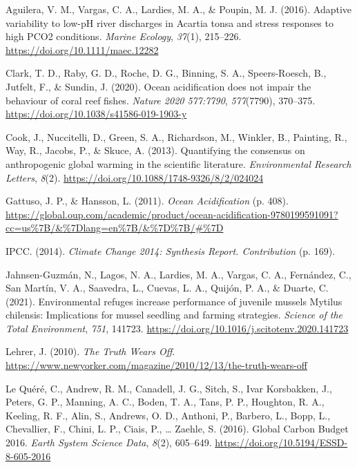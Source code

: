 \documentclass[
]{article}
\newlength{\cslhangindent}
\newenvironment{cslreferences}%
  {\setlength{\parindent}{0pt}%
  \everypar{\setlength{\hangindent}{\cslhangindent}}\ignorespaces}%
  {\par}
\begin{document}
\hypertarget{refs}{}
\begin{cslreferences}
\leavevmode\hypertarget{ref-Aguilera2016}{}%
Aguilera, V. M., Vargas, C. A., Lardies, M. A., \& Poupin, M. J. (2016).
Adaptive variability to low-pH river discharges in Acartia tonsa and
stress responses to high PCO2 conditions. \emph{Marine Ecology},
\emph{37}(1), 215--226. \url{https://doi.org/10.1111/maec.12282}

\leavevmode\hypertarget{ref-Clark2020}{}%
Clark, T. D., Raby, G. D., Roche, D. G., Binning, S. A., Speers-Roesch,
B., Jutfelt, F., \& Sundin, J. (2020). Ocean acidification does not
impair the behaviour of coral reef fishes. \emph{Nature 2020 577:7790},
\emph{577}(7790), 370--375.
\url{https://doi.org/10.1038/s41586-019-1903-y}

\leavevmode\hypertarget{ref-Cook2013b}{}%
Cook, J., Nuccitelli, D., Green, S. A., Richardson, M., Winkler, B.,
Painting, R., Way, R., Jacobs, P., \& Skuce, A. (2013). Quantifying the
consensus on anthropogenic global warming in the scientific literature.
\emph{Environmental Research Letters}, \emph{8}(2).
\url{https://doi.org/10.1088/1748-9326/8/2/024024}

\leavevmode\hypertarget{ref-Gattuso2011}{}%
Gattuso, J. P., \& Hansson, L. (2011). \emph{Ocean Acidification} (p.
408).
\url{https://global.oup.com/academic/product/ocean-acidification-9780199591091?cc=us\%7B/\&\%7Dlang=en\%7B/\&\%7D\%7B/\#\%7D}

\leavevmode\hypertarget{ref-IPCC2014}{}%
IPCC. (2014). \emph{Climate Change 2014: Synthesis Report. Contribution}
(p. 169).

\leavevmode\hypertarget{ref-Jahnsen-Guzman2021}{}%
Jahnsen-Guzmán, N., Lagos, N. A., Lardies, M. A., Vargas, C. A.,
Fernández, C., San Martín, V. A., Saavedra, L., Cuevas, L. A., Quijón,
P. A., \& Duarte, C. (2021). Environmental refuges increase performance
of juvenile mussels Mytilus chilensis: Implications for mussel seedling
and farming strategies. \emph{Science of the Total Environment},
\emph{751}, 141723.
\url{https://doi.org/10.1016/j.scitotenv.2020.141723}

\leavevmode\hypertarget{ref-Lehrer2010}{}%
Lehrer, J. (2010). \emph{The Truth Wears Off}.
\url{https://www.newyorker.com/magazine/2010/12/13/the-truth-wears-off}

\leavevmode\hypertarget{ref-LeQuere2016}{}%
Le Quéré, C., Andrew, R. M., Canadell, J. G., Sitch, S., Ivar
Korsbakken, J., Peters, G. P., Manning, A. C., Boden, T. A., Tans, P.
P., Houghton, R. A., Keeling, R. F., Alin, S., Andrews, O. D., Anthoni,
P., Barbero, L., Bopp, L., Chevallier, F., Chini, L. P., Ciais, P.,
\ldots{} Zaehle, S. (2016). Global Carbon Budget 2016. \emph{Earth
System Science Data}, \emph{8}(2), 605--649.
\url{https://doi.org/10.5194/ESSD-8-605-2016}


\end{cslreferences}
\end{document}
